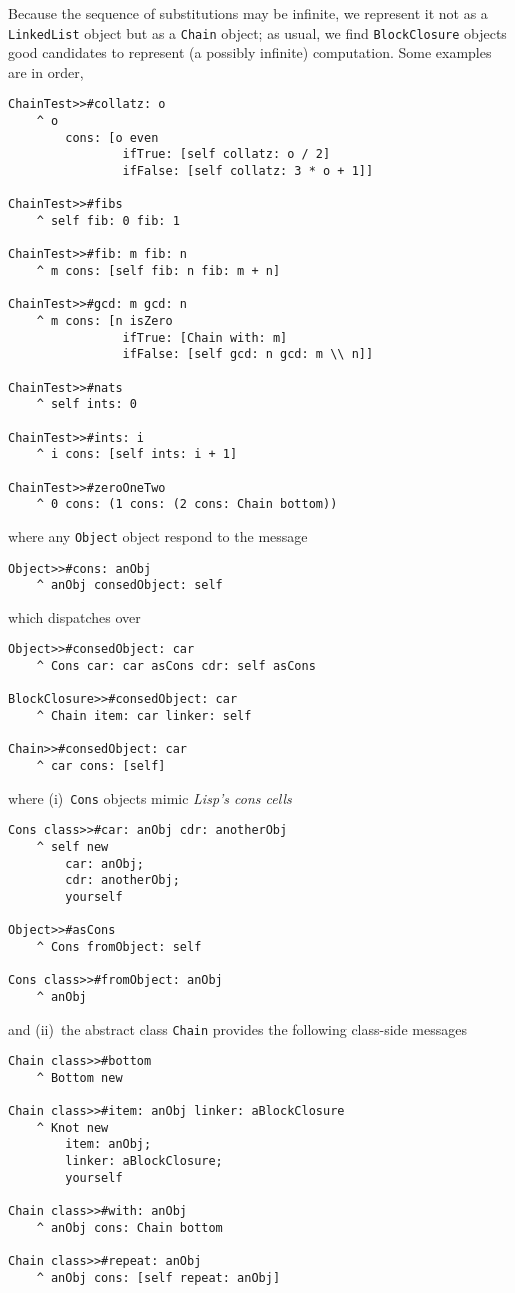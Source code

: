 \documentclass[a4paper,12pt]{article}
\begin{document}
Because the sequence of substitutions may be infinite, we
represent it not as a \Verb|LinkedList| object but as a \Verb|Chain| object;
as usual, we find \Verb|BlockClosure| objects good candidates to represent (a possibly
infinite) computation. Some examples are in order,
\begin{verbatim}
ChainTest>>#collatz: o
    ^ o
        cons: [o even
                ifTrue: [self collatz: o / 2]
                ifFalse: [self collatz: 3 * o + 1]]

ChainTest>>#fibs
    ^ self fib: 0 fib: 1

ChainTest>>#fib: m fib: n
    ^ m cons: [self fib: n fib: m + n]

ChainTest>>#gcd: m gcd: n
    ^ m cons: [n isZero
                ifTrue: [Chain with: m]
                ifFalse: [self gcd: n gcd: m \\ n]]

ChainTest>>#nats
    ^ self ints: 0

ChainTest>>#ints: i
    ^ i cons: [self ints: i + 1]

ChainTest>>#zeroOneTwo
    ^ 0 cons: (1 cons: (2 cons: Chain bottom))
\end{verbatim}
where any \Verb|Object| object respond to the message
\begin{verbatim}
Object>>#cons: anObj
    ^ anObj consedObject: self
\end{verbatim}
which dispatches over
\begin{verbatim}
Object>>#consedObject: car
    ^ Cons car: car asCons cdr: self asCons

BlockClosure>>#consedObject: car
    ^ Chain item: car linker: self

Chain>>#consedObject: car
    ^ car cons: [self]
\end{verbatim}
where (i)~\Verb|Cons| objects mimic \textit{Lisp's cons cells}
\begin{verbatim}
Cons class>>#car: anObj cdr: anotherObj
    ^ self new
        car: anObj;
        cdr: anotherObj;
        yourself

Object>>#asCons
    ^ Cons fromObject: self

Cons class>>#fromObject: anObj
    ^ anObj
\end{verbatim}
and (ii)~the abstract class \Verb|Chain| provides the following class-side messages
\begin{verbatim}
Chain class>>#bottom
    ^ Bottom new

Chain class>>#item: anObj linker: aBlockClosure
    ^ Knot new
        item: anObj;
        linker: aBlockClosure;
        yourself

Chain class>>#with: anObj
    ^ anObj cons: Chain bottom

Chain class>>#repeat: anObj
    ^ anObj cons: [self repeat: anObj]
\end{verbatim}
\end{document}
